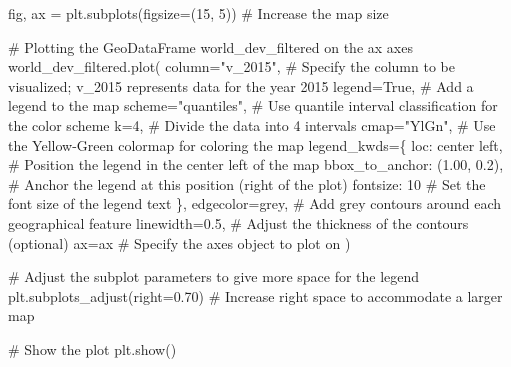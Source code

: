 \documentclass[
  letterpaper,
  DIV=11,
  numbers=noendperiod]{scrreprt}
\newenvironment{Shaded}{\begin{snugshade}}{\end{snugshade}}
\newcommand{\CommentTok}[1]{\textcolor[rgb]{0.37,0.37,0.37}{#1}}
\newcommand{\DecValTok}[1]{\textcolor[rgb]{0.68,0.00,0.00}{#1}}
\newcommand{\FloatTok}[1]{\textcolor[rgb]{0.68,0.00,0.00}{#1}}
\newcommand{\NormalTok}[1]{\textcolor[rgb]{0.00,0.23,0.31}{#1}}
\newcommand{\OperatorTok}[1]{\textcolor[rgb]{0.37,0.37,0.37}{#1}}
\newcommand{\StringTok}[1]{\textcolor[rgb]{0.13,0.47,0.30}{#1}}
\newcommand{\VariableTok}[1]{\textcolor[rgb]{0.07,0.07,0.07}{#1}}
\begin{document}
\begin{Shaded}
\begin{Highlighting}[]
\NormalTok{fig, ax }\OperatorTok{=}\NormalTok{ plt.subplots(figsize}\OperatorTok{=}\NormalTok{(}\DecValTok{15}\NormalTok{, }\DecValTok{5}\NormalTok{))  }\CommentTok{\# Increase the map size}

\CommentTok{\# Plotting the GeoDataFrame \textasciigrave{}world\_dev\_filtered\textasciigrave{} on the \textasciigrave{}ax\textasciigrave{} axes}
\NormalTok{world\_dev\_filtered.plot(}
\NormalTok{    column}\OperatorTok{=}\StringTok{"v\_2015"}\NormalTok{,  }\CommentTok{\# Specify the column to be visualized; \textasciigrave{}v\_2015\textasciigrave{} represents data for the year 2015}
\NormalTok{    legend}\OperatorTok{=}\VariableTok{True}\NormalTok{,  }\CommentTok{\# Add a legend to the map}
\NormalTok{    scheme}\OperatorTok{=}\StringTok{"quantiles"}\NormalTok{,  }\CommentTok{\# Use quantile interval classification for the color scheme}
\NormalTok{    k}\OperatorTok{=}\DecValTok{4}\NormalTok{,  }\CommentTok{\# Divide the data into 4 intervals}
\NormalTok{    cmap}\OperatorTok{=}\StringTok{"YlGn"}\NormalTok{,  }\CommentTok{\# Use the Yellow{-}Green colormap for coloring the map}
\NormalTok{    legend\_kwds}\OperatorTok{=}\NormalTok{\{}
        \StringTok{\textquotesingle{}loc\textquotesingle{}}\NormalTok{: }\StringTok{\textquotesingle{}center left\textquotesingle{}}\NormalTok{,  }\CommentTok{\# Position the legend in the center left of the map}
        \StringTok{\textquotesingle{}bbox\_to\_anchor\textquotesingle{}}\NormalTok{: (}\FloatTok{1.00}\NormalTok{, }\FloatTok{0.2}\NormalTok{),  }\CommentTok{\# Anchor the legend at this position (right of the plot)}
        \StringTok{\textquotesingle{}fontsize\textquotesingle{}}\NormalTok{: }\DecValTok{10}  \CommentTok{\# Set the font size of the legend text}
\NormalTok{    \},}
\NormalTok{    edgecolor}\OperatorTok{=}\StringTok{\textquotesingle{}grey\textquotesingle{}}\NormalTok{,  }\CommentTok{\# Add grey contours around each geographical feature}
\NormalTok{    linewidth}\OperatorTok{=}\FloatTok{0.5}\NormalTok{,  }\CommentTok{\# Adjust the thickness of the contours (optional)}
\NormalTok{    ax}\OperatorTok{=}\NormalTok{ax  }\CommentTok{\# Specify the axes object to plot on}
\NormalTok{)}

\CommentTok{\# Adjust the subplot parameters to give more space for the legend}
\NormalTok{plt.subplots\_adjust(right}\OperatorTok{=}\FloatTok{0.70}\NormalTok{)  }\CommentTok{\# Increase right space to accommodate a larger map}

\CommentTok{\# Show the plot}
\NormalTok{plt.show()}
\end{Highlighting}
\end{Shaded}
\end{document}
